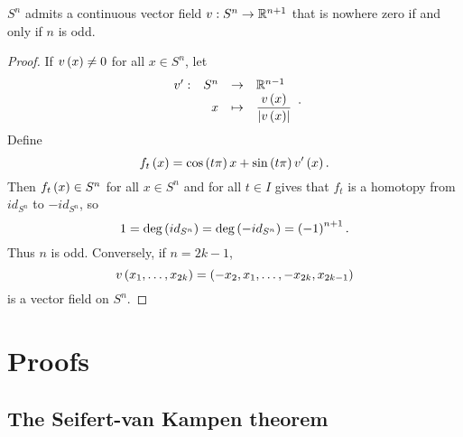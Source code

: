 \begin{theorem}
$ S^n $ admits a continuous vector field $ v : S^n \to \mathbb{R}^{n + 1} $ that is nowhere zero if and only if $ n $ is odd.
\end{theorem}

\begin{proof}
If $ v\left( x \right) \ne 0 $ for all $ x \in S^n $, let
$$ \function[v']{S^n}{\R^{n - 1}}{x}{\dfrac{v\rb{x}}{\abs{v\rb{x}}}}. $$
Define
$$ f_t\left( x \right) = \cos\left( t\pi \right)x + \sin\left( t\pi \right)v'\left( x \right). $$
Then $ f_t\left( x \right) \in S^n $ for all $ x \in S^n $ and for all $ t \in I $ gives that $ f_t $ is a homotopy from $ id_{S^n} $ to $ -id_{S^n} $, so
$$ 1 = \deg\left( id_{S^n} \right) = \deg\left( -id_{S^n} \right) = \left( -1 \right)^{n + 1}. $$
Thus $ n $ is odd. Conversely, if $ n = 2k - 1 $,
$$ v\left( x_1, \dots, x_{2k} \right) = \left( -x_2, x_1, \dots, -x_{2k}, x_{2k - 1} \right) $$
is a vector field on $ S^n $.
\end{proof}

\pagebreak

\appendix

\section{Proofs}

\subsection{The Seifert-van Kampen theorem}

